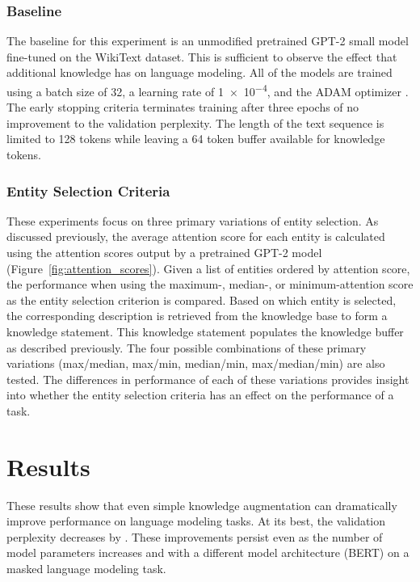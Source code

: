 \documentclass[phd,electronic,oneside,twosidetoc,letterpaper,chaptercenter,parttop,lof]{byumsphd}
\begin{document}
\subsubsection{Baseline}

The baseline for this experiment is an unmodified pretrained GPT-2 small model fine-tuned on the WikiText dataset.
This is sufficient to observe the effect that additional knowledge has on language modeling.
All of the models are trained using a batch size of 32, a learning rate of \num{1e-4}, and the ADAM optimizer \cite{kingma2015adam}.
The early stopping criteria terminates training after three epochs of no improvement to the validation perplexity.
The length of the text sequence is limited to 128 tokens while leaving a 64 token buffer available for knowledge tokens.
        
\subsubsection{Entity Selection Criteria}

These experiments focus on three primary variations of entity selection.
As discussed previously, the average attention score for each entity is calculated using the attention scores output by a pretrained GPT-2 model (Figure~\ref{fig:attention_scores}).
Given a list of entities ordered by attention score, the performance when using the maximum-, median-, or minimum-attention score as the entity selection criterion is compared. Based on which entity is selected, the corresponding description is retrieved from the knowledge base to form a knowledge statement.
This knowledge statement populates the knowledge buffer as described previously.
The four possible combinations of these primary variations (max/median, max/min, median/min, max/median/min) are also tested.
The differences in performance of each of these variations provides insight into whether the entity selection criteria has an effect on the performance of a task.

\section{Results}

These results show that even simple knowledge augmentation can dramatically improve performance on language modeling tasks.
At its best, the validation perplexity decreases by \LMLossPercentageDecrease.
These improvements persist even as the number of model parameters increases and with a different model architecture (BERT) on a masked language modeling task.
\end{document}
